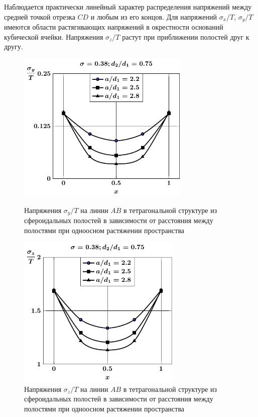 Наблюдается практически линейный характер распределения напряжений между средней точкой отрезка $CD$ и любым из его концов. Для напряжений $\sigma_x/T$, $\sigma_y/T$ имеются области растягивающих напряжений в окрестности оснований кубической ячейки. Напряжения   $\sigma_z/T$ растут при приближении полостей друг к другу.

\begin{figure}[h!]
\centering\footnotesize
\parbox[b]{7.5cm}{\centering\includegraphics[width=8.2cm]{cav8-a-d75-t1-sig_y-ab.pdf}
\caption{Напряжения $\sigma_y/T$ на линии $AB$ в тетрагональной структуре из сфероидальных полостей в зависимости от расстояния между полостями при одноосном растяжении пространства
\label{f:9:31}}}\hfil\hfil
\parbox[b]{7.5cm}{\centering\includegraphics[width=7.8cm]{cav8-a-d75-t1-sig_z-ab.pdf}
\caption{Напряжения $\sigma_z/T$ на линии $AB$ в тетрагональной структуре из сфероидальных полостей в зависимости от расстояния между полостями при одноосном растяжении пространства
\label{f:9:32}}}
\end{figure}

